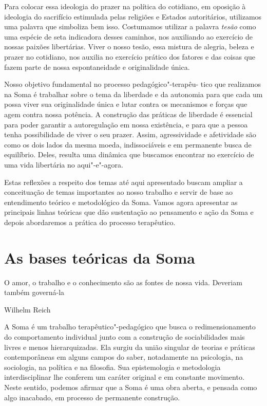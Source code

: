 Para colocar essa ideologia do prazer na política do cotidiano, em
oposição à ideologia do sacrifício estimulada pelas religiões e Estados
autoritários, utilizamos uma palavra que simboliza bem isso. Costumamos
utilizar a palavra \emph{tesão} como uma espécie de seta indicadora
desses caminhos, nos auxiliando ao exercício de nossas paixões
libertárias. Viver o nosso tesão, essa mistura de alegria, beleza e
prazer no cotidiano, nos auxilia no exercício prático dos fatores e das
coisas que fazem parte de nossa espontaneidade e originalidade única.

Nosso objetivo fundamental no processo pedagógico"-terapêu- tico que
realizamos na Soma é trabalhar sobre o tema da liberdade e da autonomia
para que cada um possa viver sua originalidade única e lutar contra os
mecanismos e forças que agem contra nossa potência. A construção das
práticas de liberdade é essencial para poder garantir a autoregulação em
nossa existência, e para que a pessoa tenha possibilidade de viver o seu
prazer. Assim, agressividade e afetividade são como os dois lados da
mesma moeda, indissociáveis e em permanente busca de equilíbrio. Deles,
resulta uma dinâmica que buscamos encontrar no exercício de uma vida
libertária no aqui"-e"-agora.

Estas reflexões a respeito dos temas até aqui apresentado buscam ampliar
a conceituação de temas importantes ao nosso trabalho e servir de base
ao entendimento teórico e metodológico da Soma. Vamos agora apresentar
as principais linhas teóricas que dão sustentação ao pensamento e ação
da Soma e depois abordaremos a prática do processo terapêutico.

\chapter{As bases teóricas da Soma}

\epigraph{O amor, o trabalho e o conhecimento são as fontes de nossa vida.
Deveriam também governá-la}{Wilhelm Reich}

A Soma é um trabalho terapêutico"-pedagógico que busca o
redimensionamento do comportamento individual junto com a construção de
sociabilidades mais livres e menos hierarquizadas. Ela surgiu da união
singular de teorias e práticas contemporâneas em alguns campos do saber,
notadamente na psicologia, na sociologia, na política e na filosofia.
Sua epistemologia e metodologia interdisciplinar lhe conferem um caráter
original e em constante movimento. Neste sentido, podemos afirmar que a
Soma é uma obra aberta, e pensada como algo inacabado, em processo de
permanente construção.

